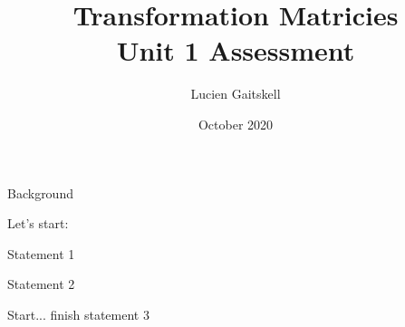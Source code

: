 \documentclass{beamer}
\title{
  Transformation Matricies \\
  \large Unit 1 Assessment
}
\author{Lucien Gaitskell}
\date{October 2020}
\begin{document}
\maketitle

\begin{frame}{Background}

Let's start:

\pause Statement 1

\pause Statement 2

Start... \pause finish statement 3\\


\end{frame}
\end{document}
